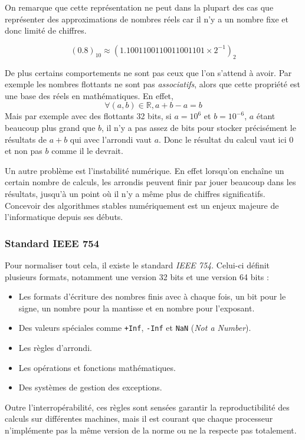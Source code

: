 \documentclass[a4paper]{report}
\begin{document}
On remarque que cette représentation ne peut dans la plupart des cas que représenter des approximations de nombres réels car il n'y a un nombre fixe et donc limité de chiffres.

\begin{displaymath}
    (0.8)_{10} \approx (1.1001100110011001101 \times 2^{-1})_{2}
\end{displaymath}

De plus certains comportements ne sont pas ceux que l'on s'attend à avoir.
Par exemple les nombres flottants ne sont pas \emph{associatifs}, alors que cette propriété est une base des réels en mathématiques.
En effet,
$$\forall (a, b) \in \mathbb{R}, a+b-a=b$$
Mais par exemple avec des flottants 32 bits, si $a=10^{6}$ et $b=10^{-6}$, $a$ étant beaucoup plus grand que $b$,
il n'y a pas assez de bits pour stocker précisément le résultats de $a+b$ qui avec l'arrondi vaut $a$.
Donc le résultat du calcul vaut ici $0$ et non pas $b$ comme il le devrait.

Un autre problème est l'instabilité numérique.
En effet lorsqu'on enchaîne un certain nombre de calculs, les arrondis peuvent finir par jouer beaucoup dans les résultats, jusqu'à un point où il n'y a même plus de chiffres significatifs.
Concevoir des algorithmes stables numériquement est un enjeux majeure de l'informatique depuis ses débuts.

\subsubsection{Standard IEEE 754}

Pour normaliser tout cela, il existe le standard \emph{IEEE 754}.
Celui-ci définit plusieurs formats, notamment une version 32 bits et une version 64 bits :
\begin{itemize}
    \item Les formats d'écriture des nombres finis avec à chaque fois, un bit pour le signe, un nombre pour la mantisse et en nombre pour l'exposant.
    \item Des valeurs spéciales comme \verb'+Inf', \verb'-Inf' et \verb'NaN' (\emph{Not a Number}).
    \item Les règles d'arrondi.
    \item Les opérations et fonctions mathématiques.
    \item Des systèmes de gestion des exceptions.
\end{itemize}

Outre l'interropérabilité, ces règles sont sensées garantir la reproductibilité des calculs sur différentes machines,
mais il est courant que chaque processeur n'implémente pas la même version de la norme ou ne la respecte pas totalement.
\end{document}
